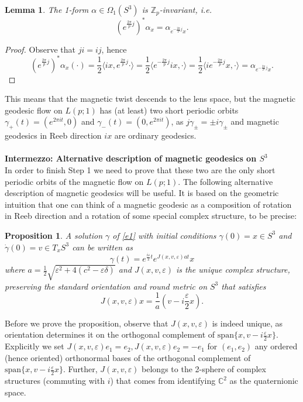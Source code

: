 \documentclass[12pt]{article}
\newtheorem{Lemma}[Definition]{Lemma}
\newtheorem{Proposition}[Definition]{Proposition}
\newcommand{\C}{\mathbb{C}} %
\newcommand{\Z}{\mathbb{Z}} %
\begin{document}
\begin{Lemma}\label{Magnetic flow is invariant under Zp}
    The 1-form $\alpha\in\Omega_1(S^3)$ is $\Z_p$-invariant, i.e.
    $$
    \left(e^{\frac{2\pi}{p}j}\right)^*\alpha_{x}=\alpha_{e^{-\frac{2\pi}{p}j} x}.
    $$
\end{Lemma}
\begin{proof} Observe that $ji=ij$, hence
    $$
    \left(e^{\frac{2\pi}{p}j}\right)^*\alpha_{x}(\cdot)=\frac{1}{2}\langle ix, e^{\frac{2\pi}{p}j}\cdot\rangle=\frac{1}{2}\langle  e^{-\frac{2\pi}{p}j}ix,\cdot\rangle=\frac{1}{2}\langle i e^{-\frac{2\pi}{p}j}x,\cdot\rangle=\alpha_{e^{-\frac{2\pi}{p}j} x}.
    $$
\end{proof}
\noindent
This means that the magnetic twist descends to the lens space, but the magnetic geodesic flow on $L(p;1)$ has (at least) two short periodic orbits $\gamma_+(t)=(e^{2\pi it},0)$ and $\gamma_-(t)=(0,e^{2\pi it})$, as $j\gamma_\pm=\pm i\gamma_\pm$ and magnetic geodesics in Reeb direction $ix$ are ordinary geodesics.\\
\ \\
\textbf{Intermezzo: Alternative description of magnetic geodesics on $S^3$}\\
In order to finish Step 1 we need to prove that these two are the only short periodic orbits of the magnetic flow on $L(p;1)$. The following alternative description of magnetic geodesics will be useful. It is based on the geometric intuition that one can think of a magnetic geodesic as a composition of rotation in Reeb direction and a rotation of some special complex structure, to be precise: 
\begin{Proposition}\label{p1}
    A solution $\gamma$ of \eqref{e1} with initial conditions $ \gamma(0)=x\in S^3$ and $\dot\gamma(0)=v \in T_xS^3$ can be written as
    $$
    \gamma(t)=e^{\frac{i\varepsilon}{2}t}e^{J(x,v,\varepsilon)at}x
    $$
    where $a=\frac{1}{2}\sqrt{\varepsilon^2+4(c^2-\varepsilon\delta)}$ and $J(x,v,\varepsilon)$ is the unique complex structure, preserving the standard orientation and round metric on $S^3$ that satisfies
    $$
    J(x,v,\varepsilon)x=\frac{1}{a}\left(v-i\frac{\varepsilon}{2}x\right).
    $$
\end{Proposition}
\noindent
Before we prove the proposition, observe that $J(x,v,\varepsilon)$ is indeed unique, as orientation determines it on the orthogonal complement of $\mathrm{span}\lbrace x, v-i\frac{\varepsilon}{2}x\rbrace$. Explicitly we set $J(x,v,\varepsilon)e_1=e_2, J(x,v,\varepsilon)e_2=-e_1$ for $(e_1,e_2)$ any ordered (hence oriented) orthonormal bases of the orthogonal complement of $\mathrm{span}\lbrace x, v-i\frac{\varepsilon}{2}x\rbrace$. Further, $J(x,v,\varepsilon)$ belongs to the 2-sphere of complex structures (commuting with $i$) that comes from identifying $\C^2$ as the quaternionic space.
\end{document}
